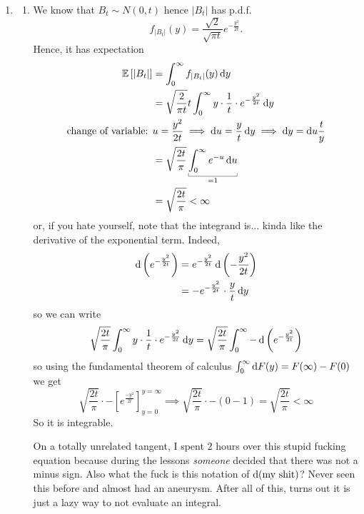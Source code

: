 \documentclass[12pt]{report}
\begin{document}
\begin{fancyproof}
\begin{enumerate}
		\item \begin{enumerate}
		\item We know that $B_{t}\sim N(0,t)$ hence $|B_{t}|$ has p.d.f.
		\begin{equation*}
			f_{|B_{t}|}(y)=\frac{\sqrt{2}}{\sqrt{\pi t}}e^{-\frac{y^{2}}{2t}}.
		\end{equation*}
		Hence, it has expectation
		\begin{align*}
			\ev{|B_{t}|}&=\int_{0}^{\infty}f_{|B_{t}|}(y)\dy\\
			&=\sqrt{\frac{2}{\pi t}}t\int_{0}^{\infty}y\cdot\frac{1}{t}\cdot e^{-\frac{y^{2}}{2t}}\dy\\
			\text{change of variable: }&u=\frac{y^{2}}{2t}\implies \du=\frac{y}{t}\dy\implies\dy=\du\frac{t}{y}\\
			&=\sqrt{\frac{2t}{\pi}}\ubracketthin{\int_{0}^{\infty}e^{-u}\du}_{=1}\\
			&=\sqrt{\frac{2t}{\pi}}<\infty
		\end{align*}
		or, if you hate yourself, note that the integrand is... kinda like the derivative of the exponential term. Indeed,
		\begin{align*}
\mathop{}\!\mathrm{d}\left(e^{-\frac{y^{2}}{2t}}\right)
			&=e^{-\frac{y^{2}}{2t}}\mathop{}\!\mathrm{d}\left(-\frac{y^{2}}{2t}\right)\\
			&=-e^{-\frac{y^{2}}{2t}}\cdot\frac{y}{t}\mathop{}\!\mathrm{d} y
		\end{align*}
		so we can write
		\begin{equation*}
				\sqrt{\frac{2t}{\pi}}\int_{0}^{\infty}y\cdot\frac{1}{t}\cdot e^{-\frac{y^{2}}{2t}}\mathop{}\!\mathrm{d} y=\sqrt{\frac{2t}{\pi}}\int_{0}^{\infty}-\mathop{}\!\mathrm{d}\left(e^{-\frac{y^{2}}{2t}}\right)
		\end{equation*}
	so using the fundamental theorem of calculus $\int_{0}^{\infty}\mathop{}\!\mathrm{d} F(y)=F(\infty)-F(0)$ we get
	\begin{equation*}
		\sqrt{\frac{2t}{\pi}}\cdot-\left[e^{\frac{-y^{2}}{2t}}\right]^{y=\infty}_{y=0}\implies\sqrt{\frac{2t}{\pi}}\cdot-(0-1)=\sqrt{\frac{2t}{\pi}}<\infty
	\end{equation*}
		So it is integrable. 
		\begin{insult}
			On a totally unrelated tangent, I spent 2 hours over this stupid fucking equation because during the lessons \textit{someone} decided that there was not a minus sign. Also what the fuck is this notation of $\mathop{}\!\mathrm{d}({\text{my shit}})$? Never seen this before and almost had an aneurysm. After all of this, turns out it is just a lazy way to not evaluate an integral.

\end{insult}
\end{enumerate}
\end{enumerate}
\end{fancyproof}
\end{document}
